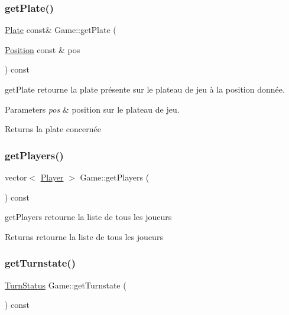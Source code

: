 \subsubsection{\texorpdfstring{getPlate()}{getPlate()}}
{\footnotesize\ttfamily \mbox{\hyperlink{class_plate}{Plate}} const\& Game\+::get\+Plate (\begin{DoxyParamCaption}\item[{\mbox{\hyperlink{class_position}{Position}} const \&}]{pos }\end{DoxyParamCaption}) const\hspace{0.3cm}{\ttfamily [inline]}}



get\+Plate retourne la plate présente sur le plateau de jeu à la position donnée. 


\begin{DoxyParams}{Parameters}
{\em pos} & position sur le plateau de jeu. \\
\hline
\end{DoxyParams}
\begin{DoxyReturn}{Returns}
la plate concernée 
\end{DoxyReturn}
\mbox{\label{class_game_a8561913d7635ac1ded36b0236ece61f7}} 
\subsubsection{\texorpdfstring{getPlayers()}{getPlayers()}}
{\footnotesize\ttfamily vector$<$ \mbox{\hyperlink{class_player}{Player}} $>$ Game\+::get\+Players (\begin{DoxyParamCaption}{ }\end{DoxyParamCaption}) const}



get\+Players retourne la liste de tous les joueurs 

\begin{DoxyReturn}{Returns}
retourne la liste de tous les joueurs 
\end{DoxyReturn}
\mbox{\label{class_game_a73c4d8e59b1ad43982115e9ff3be4d80}} 
\subsubsection{\texorpdfstring{getTurnstate()}{getTurnstate()}}
{\footnotesize\ttfamily \mbox{\hyperlink{class_game_ad84f6c74c0b4b323fe4b13b7ad31f696}{Turn\+Status}} Game\+::get\+Turnstate (\begin{DoxyParamCaption}{ }\end{DoxyParamCaption}) const\hspace{0.3cm}{\ttfamily [inline]}}



